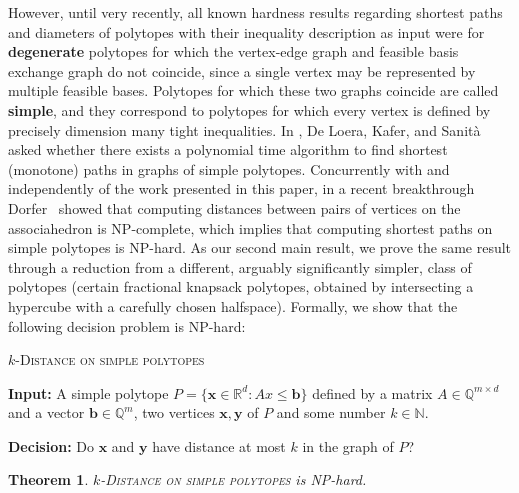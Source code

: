 \documentclass[centering,11pt,reqno]{amsart}
\newtheorem{theorem}{Theorem}[section]
\theoremstyle{definition}
\newcommand{\NP}{\textsc{NP}}
\begin{document}
However, until very recently, all known hardness results regarding shortest paths and diameters of polytopes with their inequality description as input were for \textbf{degenerate} polytopes for which the vertex-edge graph and feasible basis exchange graph do not coincide, since a single vertex may be represented by multiple feasible bases.  Polytopes for which these two graphs coincide are called \textbf{simple}, and they correspond to polytopes for which every vertex is defined by precisely dimension many tight inequalities. In \cite{CircuitPivotRules}, De Loera, Kafer, and Sanit\`{a} asked whether there exists a polynomial time algorithm to find shortest (monotone) paths in graphs of simple polytopes. Concurrently with and independently of the work presented in this paper, in a recent breakthrough Dorfer~\cite{associahedronhard} showed that computing distances between pairs of vertices on the associahedron is \NP-complete, which implies that computing shortest paths on simple polytopes is \NP-hard. As our second main result, we prove the same result through a reduction from a different, arguably significantly simpler, class of polytopes (certain fractional knapsack polytopes, obtained by intersecting a hypercube with a carefully chosen halfspace). Formally, we show that the following decision problem is \NP-hard:

\medskip

\begin{mdframed}[innerleftmargin=0.5em, innertopmargin=0.5em, innerrightmargin=0.5em, innerbottommargin=0.5em, userdefinedwidth=0.95\linewidth, align=center]
	{$k$-\textsc{Distance on simple polytopes}}
	\sloppy

	\noindent
	\textbf{Input:} A simple polytope $P = \{\mathbf{x}\in \mathbb{R}^d\colon Ax\leq \mathbf{b}\}$ defined by a matrix $A\in \mathbb{Q}^{m\times d}$ and a vector $\mathbf{b}\in \mathbb{Q}^m$, two vertices $\mathbf{x},\mathbf{y}$ of $P$ and some number $k\in\mathbb{N}$.

	\noindent
	\textbf{Decision:} Do $\mathbf{x}$ and $\mathbf{y}$ have distance at most $k$ in the graph of $P$?
\end{mdframed}

\medskip

\begin{theorem}
\label{thm:shortestpathsimple}
$k$-\textsc{Distance on simple polytopes} is \NP-hard.
\end{theorem}
\end{document}
